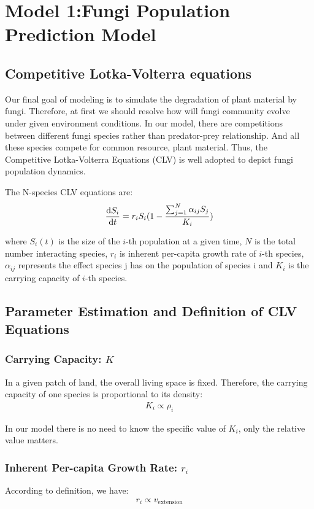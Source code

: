 \section{Model 1:Fungi Population Prediction Model}
\subsection{Competitive Lotka-Volterra equations}
	Our final goal of modeling is to simulate the degradation of plant material by fungi. Therefore, at first we should resolve how will fungi community evolve under given environment conditions. In our model, there are competitions between different fungi species rather than predator-prey relationship. And all these species compete for common resource, plant material. Thus, the Competitive Lotka-Volterra Equations (CLV) is  well adopted to depict fungi population dynamics. 

	The N-species CLV equations are: 
	\begin{align}\label{CLV}
		\frac{\textrm d S_i}{\textrm d t}=r_iS_i(1-\frac{\sum_{j=1}^N\alpha_{ij}S_j}{K_i})
	\end{align}  

	where $S_i(t)$ is the size of the $i$-th population at a given time, $N$ is the total number interacting species, $r_i$ is inherent per-capita growth rate of $i$-th species, $\alpha_{ij}$ represents the effect species j has on the population of species i and $K_i$ is the carrying capacity of $i$-th species.


 
\subsection{Parameter Estimation and Definition of CLV Equations}
\subsubsection{Carrying Capacity: $K$}
	In a given patch of land,  the overall living space is fixed. Therefore, the carrying capacity of one species is proportional to its density:
	\begin{align}
		K_i \propto \rho_i
	\end{align}

	In our model there is no need to know the specific value of $K_i$, only the relative value matters.
	
\subsubsection{Inherent Per-capita Growth Rate: $r_i$}
	According to definition, we have:
	\begin{align}
		r_i \propto v_{\text{extension}}
	\end{align}
            
